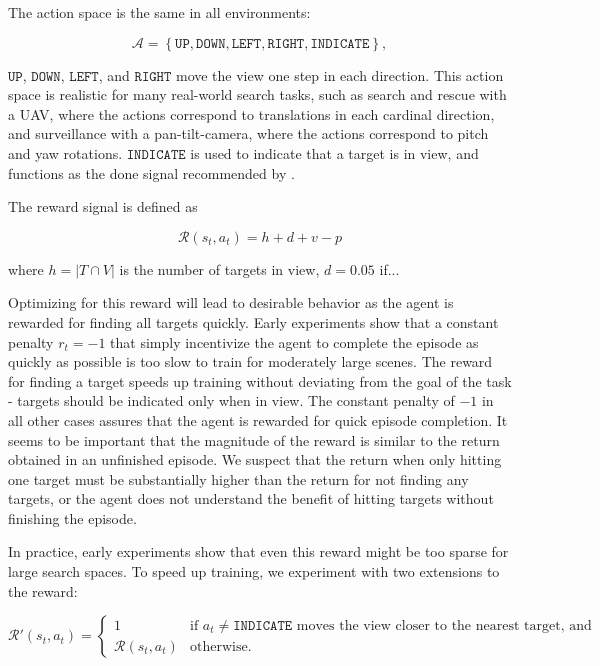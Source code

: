 The action space is the same in all environments:

\begin{equation*}
    \mathcal{A} = \left\lbrace \mathtt{UP}, \mathtt{DOWN}, \mathtt{LEFT}, \mathtt{RIGHT}, \mathtt{INDICATE} \right\rbrace,
\end{equation*}

\(\mathtt{UP}\), \(\mathtt{DOWN}\), \(\mathtt{LEFT}\), and \(\mathtt{RIGHT}\) move the view one step in each direction.
This action space is realistic for many real-world search tasks,
such as search and rescue with a UAV, where the actions correspond to translations in each cardinal direction,
and surveillance with a pan-tilt-camera, where the actions correspond to pitch and yaw rotations.
\(\mathtt{INDICATE}\) is used to indicate that a target is in view, and functions as the done signal recommended by \cite{anderson_evaluation_2018}.

The reward signal is defined as 

\begin{equation*}
    \mathcal{R}(s_t, a_t) = h + d + v - p
\end{equation*}

where \(h = \left\lvert T \cap V \right\rvert\) is the number of targets in view,
\(d = 0.05\) if...

Optimizing for this reward will lead to desirable behavior as the agent is rewarded for finding all targets quickly.
Early experiments show that a constant penalty \(r_t = -1\) that simply incentivize the agent to complete the episode as quickly as possible is too slow to train for moderately large scenes.
The reward for finding a target speeds up training without deviating from the goal of the task - targets should be indicated only when in view.
The constant penalty of \(-1\) in all other cases assures that the agent is rewarded for quick episode completion.
It seems to be important that the magnitude of the reward is similar to the return obtained in an unfinished episode.
We suspect that the return when only hitting one target must be substantially higher than the return for not finding any targets,
or the agent does not understand the benefit of hitting targets without finishing the episode. 

In practice, early experiments show that even this reward might be too sparse for large search spaces.
To speed up training, we experiment with two extensions to the reward:

\begin{equation*}
    \mathcal{R}'(s_t, a_t) =
    \begin{cases}
        1 & \text{if \(a_t \neq \mathtt{INDICATE}\) moves the view closer to the nearest target, and} \\
        \mathcal{R}(s_t, a_t) & \text{otherwise}.
    \end{cases}
\end{equation*}

